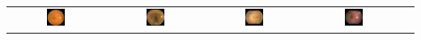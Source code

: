 \documentclass{beamer}
\begin{document}
\begin{frame}
{\begin{tabular}{|@{}c@{}|@{}c@{}|@{}c@{}|@{}c@{}|@{}c@{}|}
	\includegraphics[width=0.2\textwidth]{pics/classified_samples/204_right_1_blobs.jpg} &
	\includegraphics[width=0.2\textwidth]{pics/classified_samples/82_right_2_blobs.jpg} &
	\includegraphics[width=0.2\textwidth]{pics/classified_samples/687_right_3_blobs.jpg} &
	\includegraphics[width=0.2\textwidth]{pics/classified_samples/2496_left_4_blobs.jpg} \\

\end{tabular}
}



\end{frame}
\end{document}
